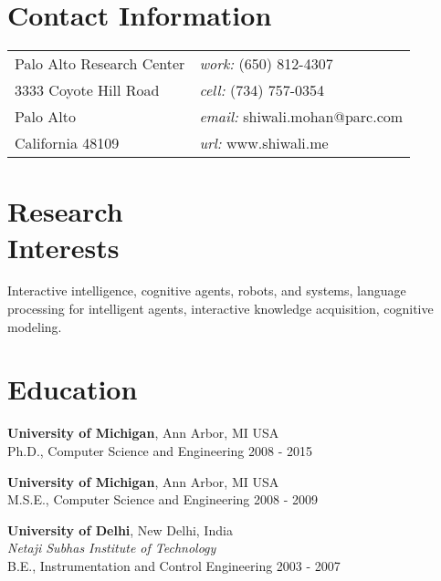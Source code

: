 \documentclass[margin,line,11pt]{res}
\begin{document}

\thispagestyle{empty}
\begin{resume}
  \section{\sc Contact Information}
  \vspace{.05in}
  \begin{tabular}{@{}p{3in}p{4in}}
    Palo Alto Research Center             & {\it work:}  (650) 812-4307 \\            
    3333 Coyote Hill Road                  & {\it cell:}    (734) 757-0354 \\         
    Palo Alto                            & {\it email:}  shiwali.mohan@parc.com\\       
    California 48109                          & {\it url:} www.shiwali.me \\     
  \end{tabular}


  \section{\sc Research \\Interests}
  Interactive intelligence, cognitive agents, robots, and systems,
  language processing for intelligent agents, interactive knowledge
  acquisition, cognitive modeling. 

  \section{\sc Education}
          {\bf University of Michigan}, Ann Arbor, MI USA\\
          Ph.D., Computer Science and Engineering \hfill 2008 - 2015 

          {\bf University of Michigan}, Ann Arbor, MI USA\\
          M.S.E., Computer Science and Engineering \hfill 2008 - 2009

          {\bf University of Delhi}, New Delhi, India\\
          {\em Netaji Subhas Institute of Technology}\\
          B.E.,  Instrumentation and Control Engineering \hfill 2003 - 2007


\end{resume}
\end{document}
